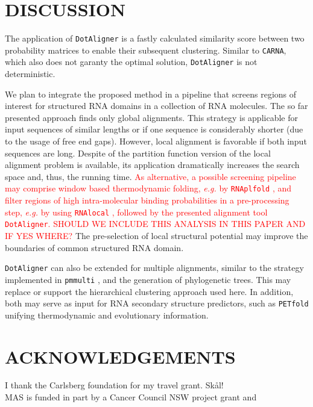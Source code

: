 \documentclass[a4paper,twoside]{article}
\newcommand\dotaligner{\texttt{DotAligner}}
\newcommand\pmmulti{\texttt{pmmulti}}
\newcommand\rnaplfold{\texttt{RNAplfold}}
\newcommand\carna{\texttt{CARNA}}
\newcommand\petfold{\texttt{PETfold}}
\newcommand\rnalocal{\texttt{RNAlocal}}
\newcommand\eg{\textit{e.g.}}
\newcommand{\RED}[1]{\textcolor{red}{#1}}
\begin{document}
\section{\uppercase{Discussion}}

\noindent The application of \dotaligner{} is a fastly
calculated similarity score between two probability matrices to enable their
subsequent clustering.  Similar to \carna{}, which also does not garanty the
optimal solution, \dotaligner{} is not deterministic.

We plan to integrate the proposed method in a pipeline that screens regions of
interest for structured RNA domains in a collection of RNA molecules.  The so
far presented approach finds only global alignments. This strategy is
applicable for input sequences of similar lengths or if one sequence is
considerably shorter (due to the usage of free end gaps). However, local
alignment is favorable if both input sequences are long. Despite of the
partition function version of the local alignment problem is available, its
application dramatically increases the search space and, thus, the running
time. \RED{As alternative, a possible screening pipeline may comprise window
based thermodynamic folding, \eg{} by \rnaplfold{}
\cite{Bernhart:Hofacker:Stadler:Local_RNA_base:2006}, and filter regions of
high intra-molecular binding probabilities in a pre-processing step, \eg{} by
using \rnalocal{} \cite{Dotu19908358}, followed by the presented alignment tool
\dotaligner. SHOULD WE INCLUDE THIS ANALYSIS IN THIS PAPER AND IF YES WHERE?}
The pre-selection of local structural potential may improve the boundaries of
common structured RNA domain. 

\dotaligner{} can also be extended for multiple alignments, similar to the strategy
implemented in \pmmulti{} \cite{Hofacker15073017}, and the generation of
phylogenetic trees. This may replace or support the hierarchical clustering
approach used here. In addition, both may serve as input for RNA secondary
structure predictors, such as \petfold{} \cite{Seemann2008} unifying
thermodynamic and evolutionary information. 


\section*{\uppercase{Acknowledgements}}

\noindent I thank the Carlsberg foundation for my travel grant. Sk\aa l! \\
MAS is funded in part by a Cancer Council NSW project grant and 



\vfill

{\small
}


\vfill
\end{document}
